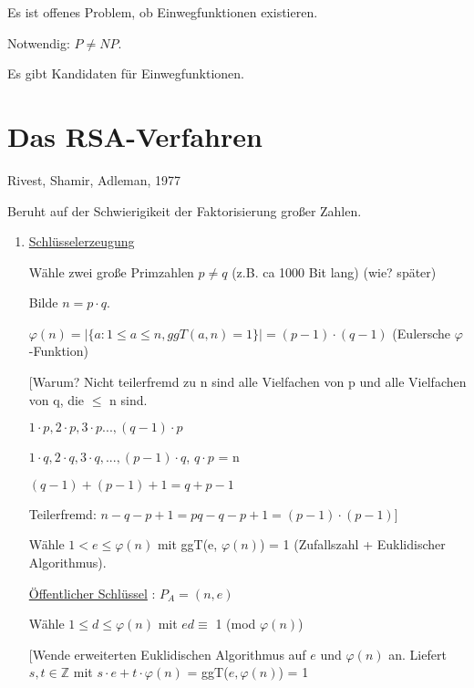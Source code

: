 Es ist offenes Problem, ob Einwegfunktionen existieren.

Notwendig: $P \neq NP$.

Es gibt Kandidaten für Einwegfunktionen.

\section{Das RSA-Verfahren}

Rivest, Shamir, Adleman, 1977

Beruht auf der Schwierigikeit der Faktorisierung großer Zahlen.

\begin{enumerate}[label=(\alph*)]
  \item \underline{Schlüsselerzeugung}

  Wähle zwei große Primzahlen $p \neq q$ (z.B. ca 1000 Bit lang) (wie? später)

  Bilde $n = p \cdot q$.

  $\varphi(n) = |\{a : 1 \le a \le n, ggT(a,n) = 1\}| = (p-1) \cdot (q-1)$ (Eulersche $\varphi$-Funktion)

  [Warum? Nicht teilerfremd zu n sind alle Vielfachen von p und alle Vielfachen von q, die $\le$ n sind.

  $1 \cdot p, 2 \cdot p, 3 \cdot p ..., (q-1) \cdot p$

  $1 \cdot q, 2 \cdot q, 3 \cdot q, ..., (p-1) \cdot q$, $q \cdot p $ = n 

  $(q-1) + (p-1) + 1 = q + p -1$

  \par \medskip

  Teilerfremd: $n-q-p+1 = pq - q - p + 1 = (p-1) \cdot (p-1)$]

  Wähle $1 < e \le \varphi(n)$ mit ggT(e, $\varphi(n)$) = 1 (Zufallszahl + Euklidischer Algorithmus).



  \par \medskip

  \underline{Öffentlicher Schlüssel} : $P_A = (n, e)$

  \par \medskip

  Wähle $1 \le d \le \varphi(n)$ mit $ed \equiv$ 1 (mod $\varphi(n)$)

  [Wende erweiterten Euklidischen Algorithmus auf $e$ und $\varphi(n)$ an. Liefert $s,t \in \mathbb{Z}$ mit $s \cdot e + t \cdot \varphi(n)$ = ggT($e, \varphi(n)$) = 1


\end{enumerate}
